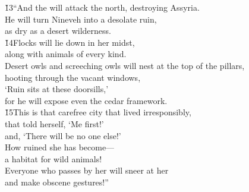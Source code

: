 \begin{poetry}
\poeml \v{13}``And the  will attack the north, destroying Assyria. \\
\poemll    He will turn Nineveh into a desolate ruin, \\
\poemlll       as dry as a desert wilderness. \\
\poeml \v{14}Flocks will lie down in her midst, \\
\poemll    along with animals of every kind. \\
\poeml Desert owls and screeching owls will nest at the top of the pillars, \\
\poemll    hooting through the vacant windows, \\
\poemlll       `Ruin sits at these doorsills,' \\
\poeml for he will expose even the cedar framework. \\
\poeml \v{15}This is that carefree city that lived irresponsibly, \\
\poemll    that told herself, `Me first!' \\
\poemlll       and, `There will be no one else!' \\
\poeml How ruined she has become--- \\
\poemll    a habitat for wild animals! \\
\poeml Everyone who passes by her will sneer at her \\
\poemll    and make obscene gestures!''
\end{poetry}

